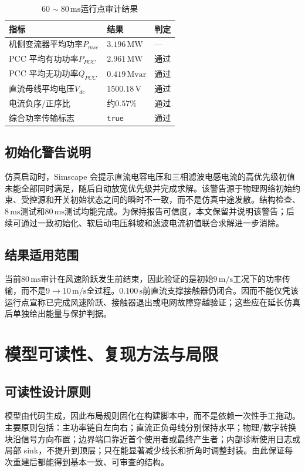 \documentclass[UTF8,zihao=-4,fontset=fandol]{ctexrep}
\begin{document}
\begin{table}[H]
\centering
\caption{\(60\sim80\,\mathrm{ms}\)运行点审计结果}
\label{tab:op}
\begin{tabular}{p{6.0cm}p{4.0cm}p{2.5cm}}
\toprule
指标 & 结果 & 判定\\
\midrule
机侧变流器平均功率\(P_{msc}\) & \(3.196\,\mathrm{MW}\) & ---\\
PCC 平均有功功率\(P_{PCC}\) & \(2.961\,\mathrm{MW}\) & 通过\\
PCC 平均无功功率\(Q_{PCC}\) & \(0.419\,\mathrm{Mvar}\) & 通过\\
直流母线平均电压\(V_{dc}\) & \(1500.18\,\mathrm{V}\) & 通过\\
电流负序/正序比 & 约\(0.57\%\) & 通过\\
综合功率传输标志 & \texttt{true} & 通过\\
\bottomrule
\end{tabular}
\end{table}

\section{初始化警告说明}
仿真启动时，Simscape 会提示直流电容电压和三相滤波电感电流的高优先级初值未能全部同时满足，随后自动放宽优先级并完成求解。该警告源于物理网络初始约束、受控源和开关初始状态之间的瞬时不一致，而不是仿真中途发散。结构检查、\(8\,\mathrm{ms}\)测试和\(80\,\mathrm{ms}\)测试均能完成。为保持报告可信度，本文保留并说明该警告；后续可通过一致初始化、软启动电压斜坡和滤波电流初值联合求解进一步消除。

\section{结果适用范围}
当前\(80\,\mathrm{ms}\)审计在风速阶跃发生前结束，因此验证的是初始\(9\,\mathrm{m/s}\)工况下的功率传输，而不是\(9\to10\,\mathrm{m/s}\)全过程。\(0.100\,\mathrm{s}\)前直流支撑接触器仍闭合。因而不能仅凭该运行点宣称已完成风速阶跃、接触器退出或电网故障穿越验证；这些应在延长仿真后单独给出能量与保护判据。

\chapter{模型可读性、复现方法与局限}
\section{可读性设计原则}
模型由代码生成，因此布局规则固化在构建脚本中，而不是依赖一次性手工拖动。主要原则包括：主功率链自左向右；直流正负母线分别保持水平；物理/数字转换块沿信号方向布置；边界端口靠近首个使用者或最终产生者；内部诊断使用日志或局部 sink，不提升到顶层；只在能显著减少线长和折角时调整封装。由此保证每次重建后都能得到基本一致、可审查的结构。
\end{document}

